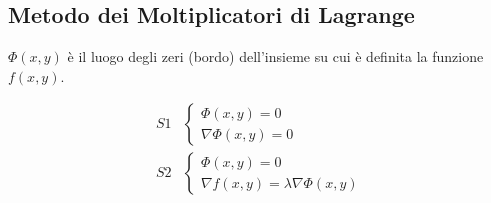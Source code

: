 \documentclass{article}
\begin{document}
\subsection{Metodo dei Moltiplicatori di Lagrange}

$\Phi(x, y)$ è il luogo degli zeri (bordo) dell'insieme su cui è definita la funzione $f(x, y)$.

\begin{equation*}
    \begin{split}
        S1 & \begin{cases}
            \Phi(x, y) = 0 \\
            \nabla \Phi(x, y) = 0
        \end{cases} \\
        S2 & \begin{cases}
            \Phi(x, y) = 0 \\
            \nabla f(x, y) = \lambda \nabla \Phi(x, y)
        \end{cases}
    \end{split}    
\end{equation*}
\end{document}
